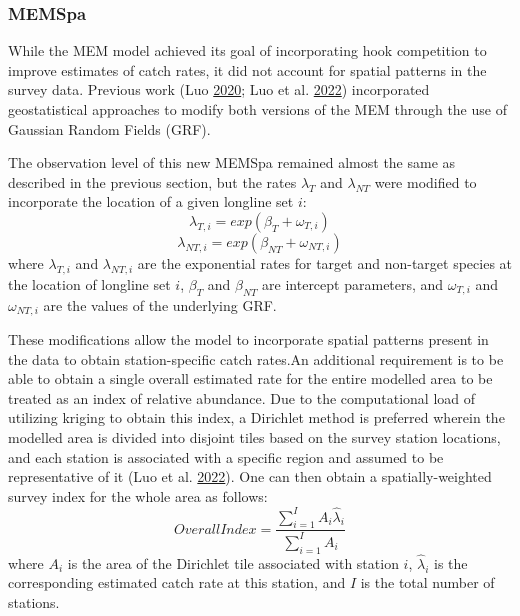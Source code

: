 \documentclass[12pt]{article}\usepackage[]{graphicx}\usepackage[]{color}
\begin{document}
\hypertarget{memspa}{%
\subsubsection{MEMSpa}\label{memspa}}

While the MEM model achieved its goal of incorporating hook competition to improve estimates of catch rates, it did not account for spatial patterns in the survey data. Previous work (Luo \protect\hyperlink{ref-Luo2020}{2020}; Luo et al. \protect\hyperlink{ref-Luo2022}{2022}) incorporated geostatistical approaches to modify both versions of the MEM through the use of Gaussian Random Fields (GRF).

The observation level of this new MEMSpa remained almost the same as described in the previous section, but the rates \(\lambda_T\) and \(\lambda_{NT}\) were modified to incorporate the location of a given longline set \(i\):
\begin{equation}
\lambda_{T,i} = exp(\beta_T+\omega_{T,i})
\end{equation} \begin{equation}
\lambda_{NT,i} = exp(\beta_{NT}+\omega_{NT,i})
\end{equation}
where \(\lambda_{T,i}\) and \(\lambda_{NT,i}\) are the exponential rates for target and non-target species at the location of longline set \(i\), \(\beta_T\) and \(\beta_{NT}\) are intercept parameters, and \(\omega_{T,i}\) and \(\omega_{NT,i}\) are the values of the underlying GRF.

These modifications allow the model to incorporate spatial patterns present in the data to obtain station-specific catch rates.An additional requirement is to be able to obtain a single overall estimated rate for the entire modelled area to be treated as an index of relative abundance. Due to the computational load of utilizing kriging to obtain this index, a Dirichlet method is preferred wherein the modelled area is divided into disjoint tiles based on the survey station locations, and each station is associated with a specific region and assumed to be representative of it (Luo et al. \protect\hyperlink{ref-Luo2022}{2022}). One can then obtain a spatially-weighted survey index for the whole area as follows:
\begin{equation}
Overall Index = \frac{\sum_{i=1}^I A_i \hat{\lambda}_i}{\sum_{i=1}^I A_i}
\end{equation}
where \(A_i\) is the area of the Dirichlet tile associated with station \(i\), \(\hat{\lambda}_i\) is the corresponding estimated catch rate at this station, and \(I\) is the total number of stations.
\end{document}
